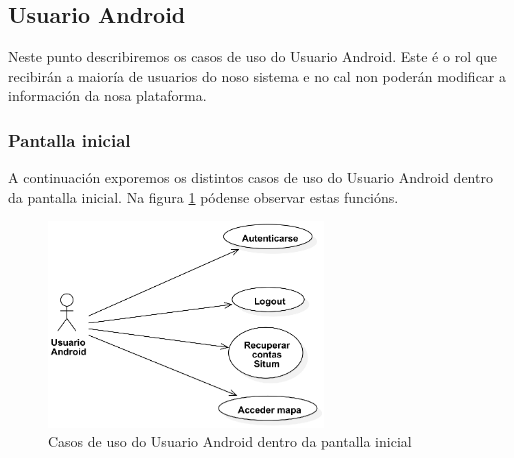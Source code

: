 \subsection{Usuario Android}

Neste punto describiremos os casos de uso do Usuario Android. Este é o rol que recibirán a maioría de usuarios do noso sistema e no cal non poderán modificar a información da nosa plataforma.

\subsubsection{Pantalla inicial}
A continuación exporemos os distintos casos de uso do Usuario Android dentro da pantalla inicial. Na figura \ref{fig:cuUsuarioAndroidPantallaInicial} pódense observar estas funcións.

\begin{figure}[tb] 
	\begin{center}
		\includegraphics[width=0.65\textwidth]{figures/CasosUso/UsuarioAndroidPantallaInicial}
		\caption{Casos de uso do Usuario Android dentro da pantalla inicial}
		\label{fig:cuUsuarioAndroidPantallaInicial}
	\end{center}
\end{figure}

